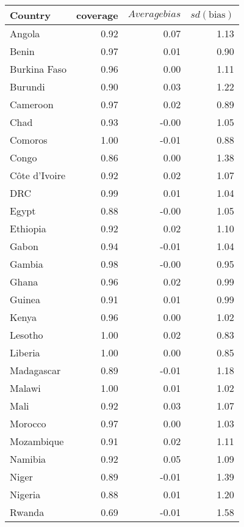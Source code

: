 \documentclass[12pt]{article}\usepackage[]{graphicx}\usepackage[]{color}
\begin{document}
\begin{table}[ht]
\centering
\begin{tabular}{lrrr}
  \hline
Country & coverage & $Average bias$ & $sd(\mbox{bias})$ \\ 
  \midrule
Angola & 0.92 & 0.07 & 1.13 \\ 
  Benin & 0.97 & 0.01 & 0.90 \\ 
  Burkina Faso & 0.96 & 0.00 & 1.11 \\ 
  Burundi & 0.90 & 0.03 & 1.22 \\ 
  Cameroon & 0.97 & 0.02 & 0.89 \\ 
  Chad & 0.93 & -0.00 & 1.05 \\ 
  Comoros & 1.00 & -0.01 & 0.88 \\ 
  Congo & 0.86 & 0.00 & 1.38 \\ 
  C\^{o}te d'Ivoire & 0.92 & 0.02 & 1.07 \\ 
  DRC & 0.99 & 0.01 & 1.04 \\ 
  Egypt & 0.88 & -0.00 & 1.05 \\ 
  Ethiopia & 0.92 & 0.02 & 1.10 \\ 
  Gabon & 0.94 & -0.01 & 1.04 \\ 
  Gambia & 0.98 & -0.00 & 0.95 \\ 
  Ghana & 0.96 & 0.02 & 0.99 \\ 
  Guinea & 0.91 & 0.01 & 0.99 \\ 
  Kenya & 0.96 & 0.00 & 1.02 \\ 
  Lesotho & 1.00 & 0.02 & 0.83 \\ 
  Liberia & 1.00 & 0.00 & 0.85 \\ 
  Madagascar & 0.89 & -0.01 & 1.18 \\ 
  Malawi & 1.00 & 0.01 & 1.02 \\ 
  Mali & 0.92 & 0.03 & 1.07 \\ 
  Morocco & 0.97 & 0.00 & 1.03 \\ 
  Mozambique & 0.91 & 0.02 & 1.11 \\ 
  Namibia & 0.92 & 0.05 & 1.09 \\ 
  Niger & 0.89 & -0.01 & 1.39 \\ 
  Nigeria & 0.88 & 0.01 & 1.20 \\ 
  Rwanda & 0.69 & -0.01 & 1.58 \\ 

\end{tabular}
\end{table}
\end{document}

